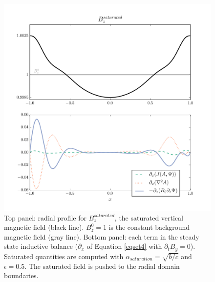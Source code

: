 \documentclass[twocolumn]{aastex61}
\begin{document}
\begin{figure}
\centering
\includegraphics[width=\columnwidth]{thingap_saturation_mechanism_plots_Bfield_slice60.pdf}
\caption{Top panel: radial profile for $B_z^{saturated}$, the saturated vertical magnetic field (black line). $B_z^0 = 1$ is the constant background magnetic field (gray line). Bottom panel: each term in the steady state inductive balance ($\partial_x$ of Equation \ref{eqset4} with $\partial_t B_y = 0$). Saturated quantities are computed with $\alpha_{saturation} = \sqrt{b/c}$ and $\epsilon = 0.5$. The saturated field is pushed to the radial domain boundaries.}\label{fig:sat_comp_Bfield}
\end{figure}

\end{document}
